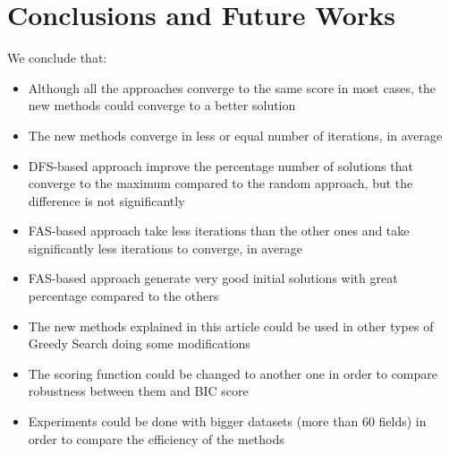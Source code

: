 \section{Conclusions and Future Works}
\label{sec:conclusions}

We conclude that:
\begin{itemize}
	\item Although all the approaches converge to the same score in most cases, the new methods could converge to a better solution
	\item The new methods converge in less or equal number of iterations, in average
	\item DFS-based approach improve the percentage number of solutions that converge to the maximum compared to the random approach, but the difference is not significantly
	\item FAS-based approach take less iterations than the other ones and take significantly less iterations to converge, in average
	\item FAS-based approach generate very good initial solutions with great percentage compared to the others
	\item The new methods explained in this article could be used in other types of Greedy Search doing some modifications
	\item The scoring function could be changed to another one in order to compare robustness between them and BIC score
	\item Experiments could be done with bigger datasets (more than 60 fields) in order to compare the efficiency of the methods
\end{itemize}